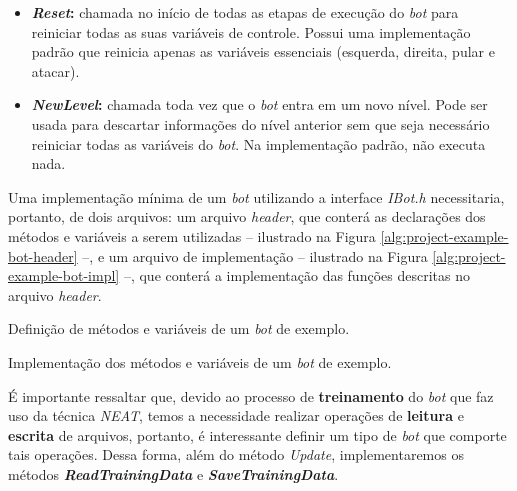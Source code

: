 \begin{itemize}
	\item
		\textbf{\textit{Reset}:} chamada no início de todas as etapas de
		execução do \textit{bot} para reiniciar todas as suas variáveis de
		controle. Possui uma implementação padrão que reinicia apenas as
		variáveis essenciais (esquerda, direita, pular e atacar).

	\item
		\textbf{\textit{NewLevel}:} chamada toda vez que o \textit{bot} entra em
		um novo nível. Pode ser usada para descartar informações do nível
		anterior sem que seja necessário reiniciar todas as variáveis do
		\textit{bot}. Na implementação padrão, não executa nada.
\end{itemize}

Uma implementação mínima de um \textit{bot} utilizando a interface
\textit{IBot.h} necessitaria, portanto, de dois arquivos: um arquivo
\textit{header}, que conterá as declarações dos métodos e variáveis a serem
utilizadas -- ilustrado na Figura \ref{alg:project-example-bot-header} --, e
um arquivo de implementação -- ilustrado na Figura
\ref{alg:project-example-bot-impl} --, que conterá a implementação das funções
descritas no arquivo \textit{header}.

\begin{algorithm}[H]

\caption[Definição de métodos e variáveis de um \textit{bot} de exemplo.]
{\label{alg:project-example-bot-header}Definição de métodos e variáveis de um
\textit{bot} de exemplo.}
\end{algorithm}

\begin{algorithm}[H]

\caption[Implementação dos métodos e variáveis de um \textit{bot} de exemplo.]
{\label{alg:project-example-bot-impl}Implementação dos métodos e variáveis de um
\textit{bot} de exemplo.}
\end{algorithm}

É importante ressaltar que, devido ao processo de \textbf{treinamento} do
\textit{bot} que faz uso da técnica \textit{NEAT}, temos a necessidade realizar
operações de \textbf{leitura} e \textbf{escrita} de arquivos, portanto, é
interessante definir um tipo de \textit{bot} que comporte tais operações. Dessa
forma, além do método \textit{Update}, implementaremos os métodos
\textbf{\textit{ReadTrainingData}} e \textbf{\textit{SaveTrainingData}}.

